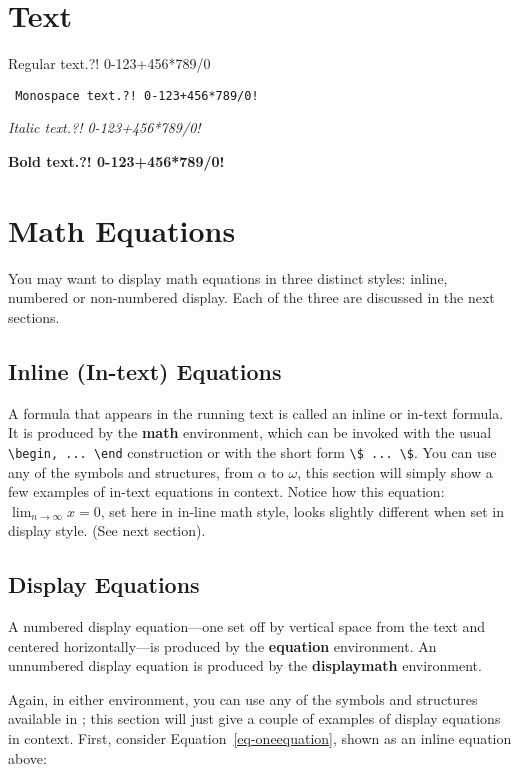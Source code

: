 \newtoggle{test-minted}

\section{Text}

Regular text.?! 0-123+456*789/0

\texttt{ Monospace text.?! 0-123+456*789/0!}

\textit{ Italic text.?! 0-123+456*789/0!}

\textbf{ Bold text.?! 0-123+456*789/0!}

\section{Math Equations}\label{math-equations}

You may want to display math equations in three distinct styles: inline,
numbered or non-numbered display. Each of the three are discussed in the
next sections.

\subsection{Inline (In-text) Equations}\label{inline-in-text-equations}

A formula that appears in the running text is called an inline or
in-text formula. It is produced by the \textbf{math} environment, which
can be invoked with the usual
\texttt{\textbackslash{}begin,\ ...\ \textbackslash{}end} construction
or with the short form
\texttt{\textbackslash{}\$\ ...\ \textbackslash{}\$}. You can use any of
the symbols and structures, from \(\alpha\) to \(\omega\), this section will simply show a few
examples of in-text equations in context. Notice how this equation:
\(\lim_{n\rightarrow \infty}x=0\), set here in in-line math style, looks
slightly different when set in display style. (See next section).

\subsection{Display Equations}\label{display-equations}

A numbered display equation---one set off by vertical space from the
text and centered horizontally---is produced by the \textbf{equation}
environment. An unnumbered display equation is produced by the
\textbf{displaymath} environment.

Again, in either environment, you can use any of the symbols and
structures available in \LaTeX@; this section will just give a couple of
examples of display equations in context. First, consider
Equation~\ref{eq-oneequation}, shown as an inline equation above:

